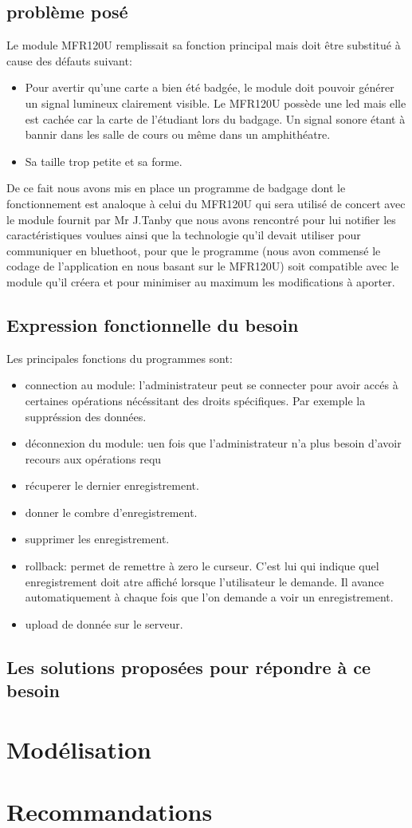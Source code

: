     \subsection{problème posé}
    Le module MFR120U remplissait sa fonction principal mais doit être substitué 
    à cause des défauts suivant:

    \begin{itemize}
    \item Pour avertir qu'une carte a bien été badgée, le module doit pouvoir générer 
    un signal lumineux clairement visible. Le MFR120U possède une led mais elle 
    est cachée car la carte de l'étudiant lors du badgage. Un signal sonore étant
    à bannir dans les salle de cours ou même dans un amphithéatre.
    \item Sa taille trop petite et sa forme.
    \end{itemize}

    De ce fait nous avons mis en place un programme de badgage dont le fonctionnement
    est analoque à celui du MFR120U qui sera utilisé de concert avec le module fournit
    par Mr J.Tanby que nous avons rencontré pour lui notifier les caractéristiques
    voulues ainsi que la technologie qu'il devait utiliser pour communiquer en 
    bluethoot, pour que le programme (nous avon commensé le codage de l'application
    en nous basant sur le MFR120U) soit compatible avec le module qu'il créera et 
    pour minimiser au maximum les modifications à aporter.


    \subsection{Expression fonctionnelle du besoin}
     Les principales fonctions du programmes sont:
    \begin{itemize}
    \item connection au module: l'administrateur peut se connecter pour avoir accés à
     certaines opérations nécéssitant des droits spécifiques. Par exemple la 
     suppréssion des données.
    \item déconnexion du module: uen fois que l'administrateur n'a plus besoin d'avoir 
     recours aux opérations requ 
    \item récuperer le dernier enregistrement.
    \item donner le combre d'enregistrement.
    \item supprimer les enregistrement.
    \item rollback: permet de remettre à zero le curseur. C'est lui qui indique quel
     enregistrement doit atre affiché lorsque l'utilisateur le demande. Il avance    
     automatiquement à chaque fois que l'on demande a voir un enregistrement.
    \item upload de donnée sur le serveur.
    \end{itemize}

    \subsection{Les solutions proposées pour répondre à ce besoin}


\section{Modélisation}
\section{Recommandations}
